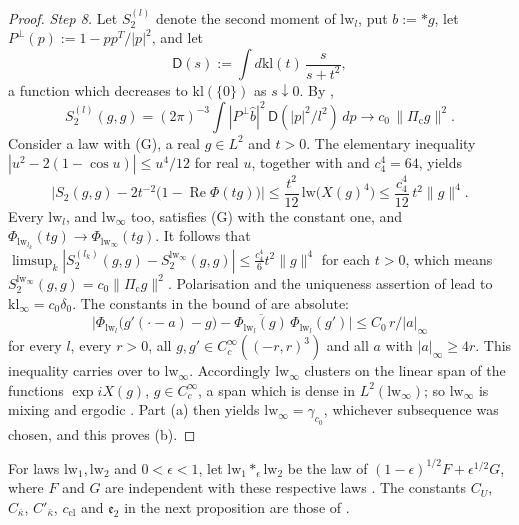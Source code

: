 \documentclass[11pt,letterpaper,reqno]{amsart}
\theoremstyle{definition}
\begin{document}
\begin{proof}
\emph{Step 8.}
Let $S_2^{(l)}$ denote the second moment of $\mathrm{lw}_l$, put $b:=\ast g$, let $P^\perp(p):=1-pp^T/|p|^2$, and let
\begin{equation*}
\mathsf D(s):=\int d\mathrm{kl}(t)\,\frac{s}{s+t^2},
\end{equation*}
a function which decreases to $\mathrm{kl}(\{0\})$ as $s\downarrow0$.
By \cite[Theorem~1.4, Part~I\,(d), (f)]{QEDII},
\begin{equation*}
S_2^{(l)}(g,g)=(2\pi)^{-3}\int|P^\perp\hat b|^2\,\mathsf D(|p|^2/l^2)\,dp\longrightarrow c_0\,\|\Pi_{\mathrm c}g\|^2.
\end{equation*}
Consider a law with (G), a real $g\in L^2$ and $t>0$.
The elementary inequality $|u^2-2(1-\cos u)|\le u^4/12$ for real $u$, together with \cite[Lemma~14.3\,(a)]{QEDII} and $c_4^4=64$, yields
\begin{equation*}
\bigl|S_2(g,g)-2t^{-2}\bigl(1-\operatorname{Re}\Phi(tg)\bigr)\bigr|\le\frac{t^2}{12}\,\mathrm{lw}\bigl(X(g)^4\bigr)\le\frac{c_4^4}{12}\,t^2\|g\|^4.
\end{equation*}
Every $\mathrm{lw}_l$, and $\mathrm{lw}_\infty$ too, satisfies (G) with the constant one, and $\Phi_{\mathrm{lw}_{l_k}}(tg)\to\Phi_{\mathrm{lw}_\infty}(tg)$.
It follows that $\limsup_k|S_2^{(l_k)}(g,\allowbreak g)-S_2^{\mathrm{lw}_\infty}(g,\allowbreak g)|\le\frac{c_4^4}6t^2\|g\|^4$ for each $t>0$, which means $S_2^{\mathrm{lw}_\infty}(g,g)=c_0\|\Pi_{\mathrm c}g\|^2$.
Polarisation and the uniqueness assertion of \cite[Theorem~1.4, Part~I\,(d), (f)]{QEDII} lead to $\mathrm{kl}_\infty=c_0\delta_0$.
The constants in the bound of \cite[Theorem~12.39]{QEDII} are absolute:
\begin{equation*}
\bigl|\Phi_{\mathrm{lw}_l}\bigl(g'(\cdot-a)-g\bigr)-\overline{\Phi_{\mathrm{lw}_l}(g)}\,\Phi_{\mathrm{lw}_l}(g')\bigr|\le C_0\,r/|a|_\infty
\end{equation*}
for every $l$, every $r>0$, all $g,g'\in C_c^\infty((-r,r)^3)$ and all $a$ with $|a|_\infty\ge4r$.
This inequality carries over to $\mathrm{lw}_\infty$.
Accordingly $\mathrm{lw}_\infty$ clusters on the linear span of the functions $\exp iX(g)$, $g\in C_c^\infty$, a span which is dense in $L^2(\mathrm{lw}_\infty)$; so $\mathrm{lw}_\infty$ is mixing and ergodic \cite[Section~8.1.4, Lemma~8.14\,(a)]{QEDI}.
Part (a) then yields $\mathrm{lw}_\infty=\gamma_{c_0}$, whichever subsequence was chosen, and this proves (b).
\end{proof}
For laws $\mathrm{lw}_1,\mathrm{lw}_2$ and $0<\epsilon<1$, let
$\mathrm{lw}_1\ast_\epsilon\mathrm{lw}_2$ be the law of
$(1-\epsilon)^{1/2}F+\epsilon^{1/2}G$, where $F$ and $G$ are independent
with these respective laws \cite[Section~21.11.1]{QEDI}.
The constants $C_U$, $C_{\bar\kappa}$, $C'_{\bar\kappa}$,
$c_{\mathrm{cl}}$ and $\mathfrak e_2$ in the next proposition are those of
\cite[Theorem~44]{QEDIII}.
\end{document}
